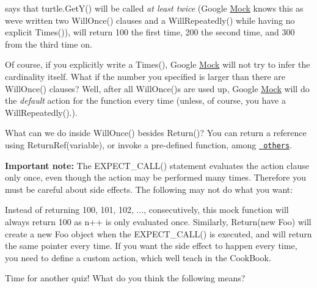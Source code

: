 says that {\ttfamily turtle.\+Get\+Y()} will be called {\itshape at least twice} (Google \mbox{\hyperlink{class_mock}{Mock}} knows this as we\textquotesingle{}ve written two {\ttfamily Will\+Once()} clauses and a {\ttfamily Will\+Repeatedly()} while having no explicit {\ttfamily Times()}), will return 100 the first time, 200 the second time, and 300 from the third time on.

Of course, if you explicitly write a {\ttfamily Times()}, Google \mbox{\hyperlink{class_mock}{Mock}} will not try to infer the cardinality itself. What if the number you specified is larger than there are {\ttfamily Will\+Once()} clauses? Well, after all {\ttfamily Will\+Once()}s are used up, Google \mbox{\hyperlink{class_mock}{Mock}} will do the {\itshape default} action for the function every time (unless, of course, you have a {\ttfamily Will\+Repeatedly()}.).

What can we do inside {\ttfamily Will\+Once()} besides {\ttfamily Return()}? You can return a reference using {\ttfamily Return\+Ref(variable)}, or invoke a pre-\/defined function, among \href{CheatSheet.md#actions}\texttt{ others}.

{\bfseries{Important note\+:}} The {\ttfamily E\+X\+P\+E\+C\+T\+\_\+\+C\+A\+L\+L()} statement evaluates the action clause only once, even though the action may be performed many times. Therefore you must be careful about side effects. The following may not do what you want\+:


\begin{DoxyCode}{0}
\end{DoxyCode}


Instead of returning 100, 101, 102, ..., consecutively, this mock function will always return 100 as {\ttfamily n++} is only evaluated once. Similarly, {\ttfamily Return(new Foo)} will create a new {\ttfamily Foo} object when the {\ttfamily E\+X\+P\+E\+C\+T\+\_\+\+C\+A\+L\+L()} is executed, and will return the same pointer every time. If you want the side effect to happen every time, you need to define a custom action, which we\textquotesingle{}ll teach in the Cook\+Book.

Time for another quiz! What do you think the following means?


\begin{DoxyCode}{0}
\end{DoxyCode}


